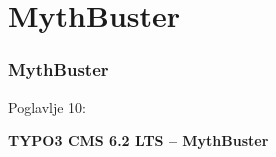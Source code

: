 %

\section{MythBuster}
\begin{frame}[fragile]
	\frametitle{MythBuster}

	\begin{center}\huge{Poglavlje 10:}\end{center}
	\begin{center}\huge{\color{typo3darkgrey}\textbf{TYPO3 CMS 6.2 LTS – MythBuster}}\end{center}

\end{frame}


